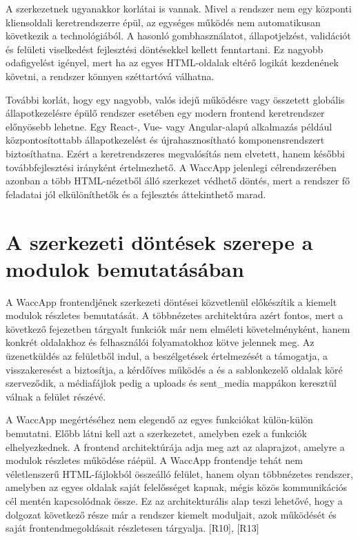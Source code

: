 A szerkezetnek ugyanakkor korlátai is vannak. Mivel a rendszer nem egy központi kliensoldali keretrendszerre épül, az egységes működés nem automatikusan következik a technológiából. A hasonló gombhasználatot, állapotjelzést, validációt és felületi viselkedést fejlesztési döntésekkel kellett fenntartani. Ez nagyobb odafigyelést igényel, mert ha az egyes HTML-oldalak eltérő logikát kezdenének követni, a rendszer könnyen széttartóvá válhatna. 

További korlát, hogy egy nagyobb, valós idejű működésre vagy összetett globális állapotkezelésre épülő rendszer esetében egy modern frontend keretrendszer előnyösebb lehetne. Egy React-, Vue- vagy Angular-alapú alkalmazás például központosítottabb állapotkezelést és újrahasznosítható komponensrendszert biztosíthatna. Ezért a keretrendszeres megvalósítás nem elvetett, hanem későbbi továbbfejlesztési irányként értelmezhető. A WaccApp jelenlegi célrendszerében azonban a több HTML-nézetből álló szerkezet védhető döntés, mert a rendszer fő feladatai jól elkülöníthetők és a fejlesztés áttekinthető marad. 

\section{A szerkezeti döntések szerepe a modulok bemutatásában}

A WaccApp frontendjének szerkezeti döntései közvetlenül előkészítik a kiemelt modulok részletes bemutatását. A többnézetes architektúra azért fontos, mert a következő fejezetben tárgyalt funkciók már nem elméleti követelményként, hanem konkrét oldalakhoz és felhasználói folyamatokhoz kötve jelennek meg. Az üzenetküldés az  felületből indul, a beszélgetések értelmezését a  támogatja, a visszakeresést a  biztosítja, a kérdőíves működés a  és a sablonkezelő oldalak köré szerveződik, a médiafájlok pedig a uploads és sent\_media mappákon keresztül válnak a felület részévé. 

A WaccApp megértéséhez nem elegendő az egyes funkciókat külön-külön bemutatni. Előbb látni kell azt a szerkezetet, amelyben ezek a funkciók elhelyezkednek. A frontend architektúrája adja meg azt az alaprajzot, amelyre a modulok részletes működése ráépül. A WaccApp frontendje tehát nem véletlenszerű HTML-fájlokból összeálló felület, hanem olyan többnézetes rendszer, amelyben az egyes oldalak saját felelősséget kapnak, mégis közös kommunikációs cél mentén kapcsolódnak össze. Ez az architekturális alap teszi lehetővé, hogy a dolgozat következő része már a rendszer kiemelt moduljait, azok működését és saját frontendmegoldásait részletesen tárgyalja. [R10], [R13] 
